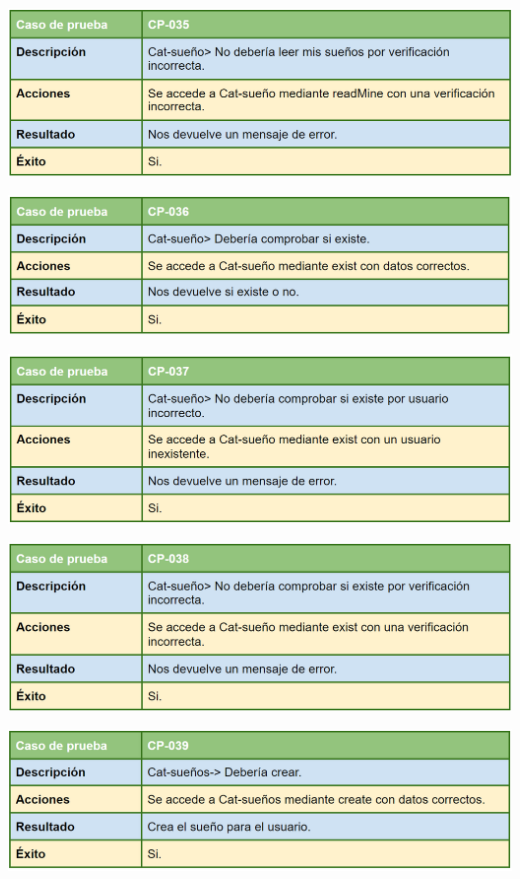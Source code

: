 \bigskip

\includegraphics[width=\textwidth]{img/cap7/cp-035.png}

\bigskip

\includegraphics[width=\textwidth]{img/cap7/cp-036.png}

\bigskip

\includegraphics[width=\textwidth]{img/cap7/cp-037.png}

\bigskip

\includegraphics[width=\textwidth]{img/cap7/cp-038.png}

\bigskip

\includegraphics[width=\textwidth]{img/cap7/cp-039.png}

